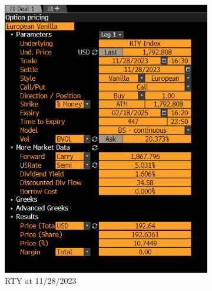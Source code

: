 \documentclass[12pt,a4paper]{article}
\begin{document}
\begin{enumerate}
\begin{figure}[H]
    \centering
    \begin{subfigure}{0.48\textwidth}
        \centering
        \includegraphics[width=\textwidth, height=0.4\textheight]{images_project_2/rty_div.png}
        \caption{RTY at 11/28/2023}
        \label{fig:rty_vol}
    \end{subfigure}
    \hfill
    \begin{subfigure}{0.48\textwidth}
        \centering

\end{subfigure}
\end{figure}
\end{enumerate}
\end{document}
